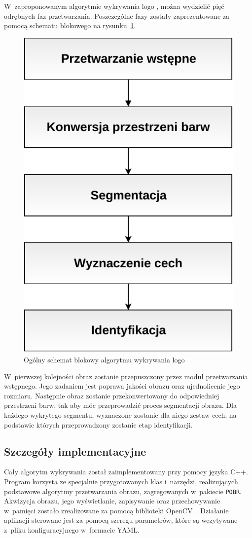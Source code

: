 W~zaproponowanym algorytmie wykrywania logo \bk, można wydzielić pięć odrębnych faz przetwarzania. Poszczególne fazy zostały zaprezentowane za pomocą schematu blokowego na rysunku~\ref{fig:algorithm-overview}.

\begin{figure}[h]
    \centering
    \includegraphics[width=0.6\columnwidth]{figures/algorithmOverview.pdf}
    \caption{Ogólny schemat blokowy algorytmu wykrywania logo \bk}
    \label{fig:algorithm-overview}
\end{figure}

W~pierwszej kolejności obraz zostanie przepuszczony przez moduł przetwarzania wstępnego. Jego zadaniem jest poprawa jakości obrazu oraz ujednolicenie jego rozmiaru.
Następnie obraz zostanie przekonwertowany do odpowiedniej przestrzeni barw, tak aby móc przeprowadzić proces segmentacji obrazu. Dla każdego wykrytego segmentu, wyznaczone zostanie dla niego zestaw cech, na podstawie których przeprowadzony zostanie etap identyfikacji.

\subsection{Szczegóły implementacyjne}
Cały algorytm wykrywania został zaimplementowany przy pomocy języka C++. Program korzysta ze specjalnie przygotowanych klas i~narzędzi, realizujących podstawowe algorytmy przetwarzania obrazu, zagregowanych w~pakiecie \texttt{POBR}. Akwizycja obrazu, jego wyświetlanie, zapisywanie oraz przechowywanie w~pamięci zostało zrealizowane za pomocą biblioteki OpenCV~\cite{opencv}. Działanie aplikacji sterowane jest za pomocą szeregu parametrów, które są wczytywane z~pliku konfiguracyjnego w~formacie YAML.